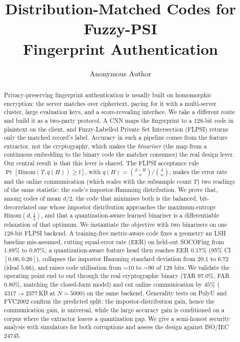 \documentclass[runningheads]{llncs}
\begin{document}
\title{Distribution-Matched Codes for Fuzzy-PSI\\
       Fingerprint Authentication}

\author{Anonymous Author}

\maketitle

\begin{abstract}
Privacy-preserving fingerprint authentication is usually built on homomorphic encryption:
the server matches over ciphertext, paying for it with a multi-server cluster, large
evaluation keys, and a score-revealing interface. We take a different route and build it as a
two-party protocol. A CNN maps the fingerprint to a 128-bit code in plaintext on the client,
and Fuzzy-Labelled Private Set Intersection (FLPSI) returns only the matched record's label.
Accuracy in such a pipeline comes from the feature extractor, not the cryptography, which
makes the \emph{binariser} (the map from a continuous embedding to the binary code the matcher
consumes) the real design lever. Our central result is that this lever is shared. The FLPSI
acceptance rule $\Pr[\mathrm{Binom}(T,q(H)) \ge t]$, with $q(H)=\binom{d-H}{w}/\binom{d}{w}$,
makes the error rate and the online communication (which scales with the subsample count $T$)
two readings of the same statistic: the code's impostor-Hamming distribution. We prove that,
among codes of mean $d/2$, the code that minimises both is the balanced, bit-decorrelated one
whose impostor distribution approaches the maximum-entropy $\mathrm{Binom}(d,\tfrac12)$, and
that a quantization-aware learned binariser is a differentiable relaxation of that optimum.
We instantiate the objective with two binarisers on one 128-bit FLPSI backend. A training-free
metric-aware code fixes a geometry an LSH baseline mis-assumed, cutting equal-error rate (EER)
on held-out SOCOFing from $1.89\%$ to $0.87\%$; a quantization-aware feature head then reaches
EER $\mathbf{0.17\%}$ (95\% CI $[0.06,0.26]$), collapses the impostor Hamming standard deviation
from $20.1$ to $6.72$ (ideal $5.66$), and raises code utilisation from ${\sim}10$ to ${\sim}90$
of $128$ bits. We validate the operating point end to end through the real cryptographic binary
(TAR $97.0\%$, FAR $0.80\%$, matching the closed-form model) and cut online communication by
$45\%$ ($4317 \to 2377$\,KB at $N{=}5000$) on the same backend. Generality tests on PolyU and
FVC2002 confirm the predicted split: the impostor-distribution gain, hence the communication
gain, is universal, while the large accuracy gain is conditioned on a corpus where the extractor
leaves a quantization gap. We give a semi-honest security analysis with simulators for both
corruptions and assess the design against ISO/IEC 24745.

\end{abstract}
\end{document}
